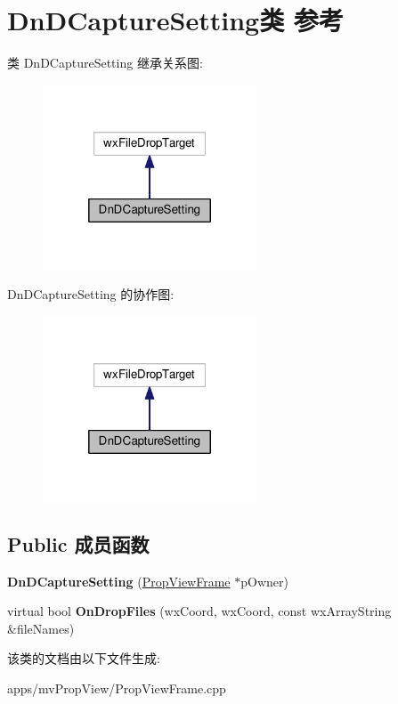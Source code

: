 \hypertarget{class_dn_d_capture_setting}{\section{Dn\+D\+Capture\+Setting类 参考}
\label{class_dn_d_capture_setting}
}


类 Dn\+D\+Capture\+Setting 继承关系图\+:
\nopagebreak
\begin{figure}[H]
\begin{center}
\leavevmode
\includegraphics[width=180pt]{class_dn_d_capture_setting__inherit__graph}
\end{center}
\end{figure}


Dn\+D\+Capture\+Setting 的协作图\+:
\nopagebreak
\begin{figure}[H]
\begin{center}
\leavevmode
\includegraphics[width=180pt]{class_dn_d_capture_setting__coll__graph}
\end{center}
\end{figure}
\subsection*{Public 成员函数}
\begin{DoxyCompactItemize}
\item 
\hypertarget{class_dn_d_capture_setting_a79fb8226b1efd27780857398e245b04d}{{\bfseries Dn\+D\+Capture\+Setting} (\hyperlink{class_prop_view_frame}{Prop\+View\+Frame} $\ast$p\+Owner)}\label{class_dn_d_capture_setting_a79fb8226b1efd27780857398e245b04d}

\item 
\hypertarget{class_dn_d_capture_setting_ace2d155dc258ad41e2ec37e3c969e707}{virtual bool {\bfseries On\+Drop\+Files} (wx\+Coord, wx\+Coord, const wx\+Array\+String \&file\+Names)}\label{class_dn_d_capture_setting_ace2d155dc258ad41e2ec37e3c969e707}

\end{DoxyCompactItemize}


该类的文档由以下文件生成\+:\begin{DoxyCompactItemize}
\item 
apps/mv\+Prop\+View/Prop\+View\+Frame.\+cpp\end{DoxyCompactItemize}
